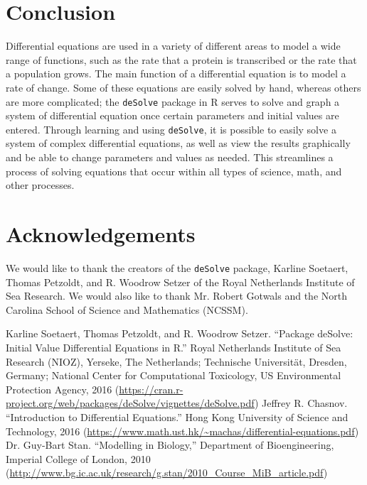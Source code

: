 \section{Conclusion}

Differential equations are used in a variety of different areas to model a wide range of functions, such as the rate that a protein is transcribed or the rate that a population grows. The main function of a differential equation is to model a rate of change. Some of these equations are easily solved by hand, whereas others are more complicated; the \texttt{deSolve} package in R serves to solve and graph a system of differential equation once certain parameters and initial values are entered. Through learning and using \texttt{deSolve}, it is possible to easily solve a system of complex differential equations, as well as view the results graphically and be able to change parameters and values as needed. This streamlines a process of solving equations that occur within all types of science, math, and other processes.

\section{Acknowledgements}

We would like to thank the creators of the \texttt{deSolve} package, Karline Soetaert, Thomas Petzoldt, and R. Woodrow Setzer of the Royal Netherlands Institute of Sea Research. We would also like to thank Mr. Robert Gotwals and the North Carolina School of Science and Mathematics (NCSSM).

\begin{thebibliography}{3}
        Karline Soetaert, Thomas Petzoldt, and R. Woodrow Setzer. ``Package deSolve: Initial Value Differential Equations in R.'' Royal Netherlands Institute of Sea Research (NIOZ), Yerseke, The Netherlands; Technische Universit{\"a}t, Dresden, Germany; National Center for Computational Toxicology, US Environmental Protection Agency, 2016 (\url{https://cran.r-project.org/web/packages/deSolve/vignettes/deSolve.pdf})
        Jeffrey R. Chasnov. ``Introduction to Differential Equations.'' Hong Kong University of Science and Technology, 2016 (\url{https://www.math.ust.hk/~machas/differential-equations.pdf})
        Dr. Guy-Bart Stan. ``Modelling in Biology,'' Department of Bioengineering, Imperial College of London, 2010 (\url{http://www.bg.ic.ac.uk/research/g.stan/2010_Course_MiB_article.pdf})
\end{thebibliography}


